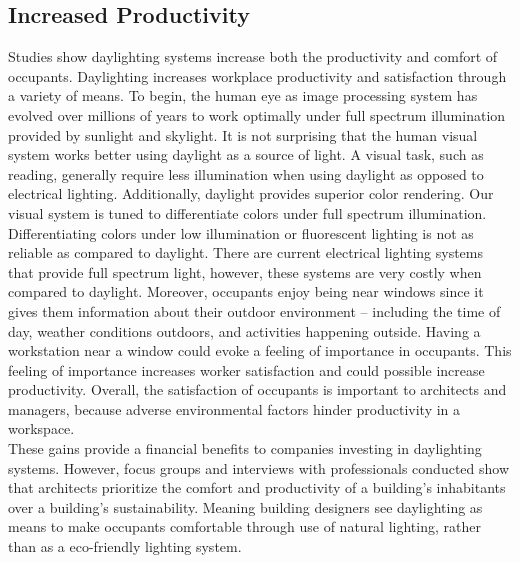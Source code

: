   \subsection{Increased Productivity}
    Studies show daylighting systems increase both the productivity and comfort of occupants\cite{Menzies}.  Daylighting increases workplace productivity and satisfaction through a variety of means. To begin, the human eye as image processing system has evolved over millions of years to work optimally under full spectrum illumination provided by sunlight and skylight. It is not surprising that the human visual system works better using daylight as a source of light. A visual task, such as reading, generally require less illumination when using daylight as opposed to electrical lighting\cite{Robbins}. Additionally, daylight provides superior color rendering. Our visual system is tuned to differentiate colors under full spectrum illumination. Differentiating colors under low illumination or fluorescent lighting is not as reliable as compared to daylight\cite{Robbins}. There are current electrical lighting systems that provide full spectrum light, however, these systems are very costly when compared to daylight. Moreover, occupants enjoy being near windows since it gives them information about their outdoor environment -- including the time of day, weather conditions outdoors, and activities happening outside. Having a workstation near a window could evoke a feeling of importance in occupants. This feeling of importance increases worker satisfaction and could possible increase productivity\cite{Leslie}. Overall, the satisfaction of occupants is important to architects and managers, because adverse environmental factors hinder productivity in a workspace.  \\

    These gains provide a financial benefits to companies investing in daylighting systems. However, focus groups and interviews with professionals conducted show that architects prioritize the comfort and productivity of a building’s inhabitants over a building’s sustainability\cite{Menzies}. Meaning building designers see daylighting as means to make occupants comfortable through use of natural lighting, rather than as a eco-friendly lighting system. \\

